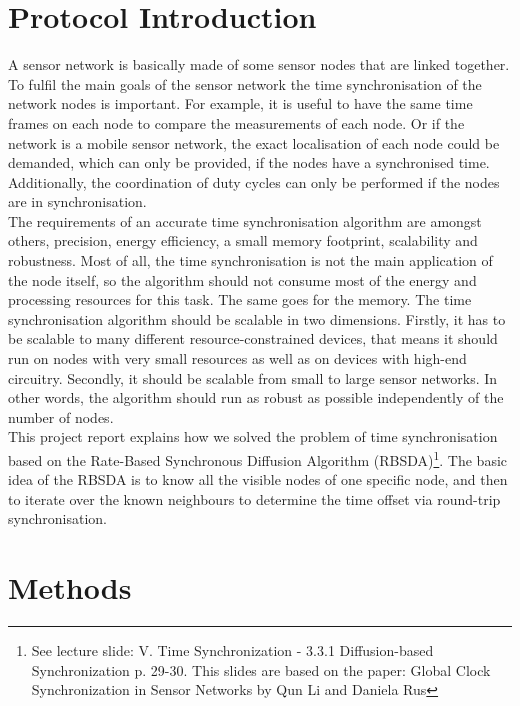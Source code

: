 \documentclass{llncs}
\begin{document}
\section{Protocol Introduction}
A sensor network is basically made of some sensor nodes that are linked together. To fulfil the main goals of the sensor network the time synchronisation of the network nodes is important.  For example, it is useful to have the same time frames on each node to compare the measurements of each node. Or if the network is a mobile sensor network, the exact localisation of each node could be demanded, which can only be provided, if the nodes have a synchronised time. Additionally, the coordination of duty cycles can only be performed if the nodes are in synchronisation.\\
\indent The requirements of an accurate time synchronisation algorithm are amongst others, precision, energy efficiency, a small memory footprint, scalability and robustness. Most of all, the time synchronisation is not the main application of the node itself, so the algorithm should not consume most of the energy and processing resources for this task. The same goes for the memory. The time synchronisation algorithm should be scalable in two dimensions. Firstly, it has to be scalable to many different resource-constrained devices, that means it should run on nodes with very small resources as well as on devices with high-end circuitry. Secondly, it should be scalable from small to large sensor networks. In other words, the algorithm should run as robust as possible independently of the number of nodes.\\
\indent This project report explains how we solved the problem of time synchronisation based on the Rate-Based Synchronous Diffusion Algorithm (RBSDA)\footnote{See lecture slide: V. Time Synchronization - 3.3.1 Diffusion-based Synchronization p. 29-30. This slides are based on the paper: Global Clock Synchronization in Sensor Networks by Qun Li and  Daniela Rus\cite{LiRus2006}}. The basic idea of the RBSDA is to know all the visible nodes of one specific node, and then to iterate over the known neighbours to determine the time offset via round-trip synchronisation.\\

\section{Methods}
\end{document}
